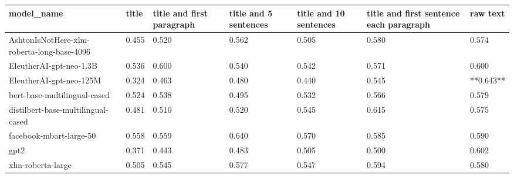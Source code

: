 \begin{tabular}{lllllll}
\toprule
                                model\_name & title & title and first paragraph & title and 5 sentences & title and 10 sentences & title and first sentence each paragraph &  raw text \\
\midrule
AshtonIsNotHere-xlm-roberta-long-base-4096 & 0.455 &                     0.520 &                 0.562 &                  0.505 &                                   0.580 &     0.574 \\
                   EleutherAI-gpt-neo-1.3B & 0.536 &                     0.600 &                 0.540 &                  0.542 &                                   0.571 &     0.600 \\
                   EleutherAI-gpt-neo-125M & 0.324 &                     0.463 &                 0.480 &                  0.440 &                                   0.545 & **0.643** \\
              bert-base-multilingual-cased & 0.524 &                     0.538 &                 0.495 &                  0.532 &                                   0.566 &     0.579 \\
        distilbert-base-multilingual-cased & 0.481 &                     0.510 &                 0.520 &                  0.545 &                                   0.615 &     0.575 \\
                   facebook-mbart-large-50 & 0.558 &                     0.559 &                 0.640 &                  0.570 &                                   0.585 &     0.590 \\
                                      gpt2 & 0.371 &                     0.443 &                 0.483 &                  0.505 &                                   0.500 &     0.602 \\
                         xlm-roberta-large & 0.505 &                     0.545 &                 0.577 &                  0.547 &                                   0.594 &     0.580 \\
\bottomrule
\end{tabular}
